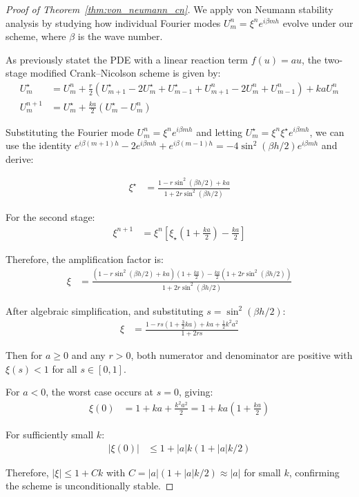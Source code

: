  \begin{proof}[Proof of Theorem~\ref{thm:von_neumann_cn}]
    We apply von Neumann stability analysis by studying how individual Fourier modes $U_m^n = \xi^n e^{i\beta mh}$ 
    evolve under our scheme, where $\beta$ is the wave number.
  
    As previously statet the PDE with a linear reaction term $f(u) = au$, the two-stage modified Crank--Nicolson 
    scheme is given by:
    \begin{align*}
      U_m^\star & = U_m^n + \frac{r}{2}\left(U_{m+1}^\star - 2U_m^\star + U_{m-1}^\star + U_{m+1}^n - 2U_m^n + U_{m-1}^n\right) + kaU_m^n \\
      U_m^{n+1} & = U_m^\star + \frac{ka}{2}(U_m^\star - U_m^n)
    \end{align*}
  
    Substituting the Fourier mode $U_m^n = \xi^n e^{i\beta mh}$ and letting 
    $U_m^\star = \xi^n \xi^\star e^{i\beta mh}$, we can use the identity 
    $e^{i\beta (m+1)h} - 2e^{i\beta mh} + e^{i\beta (m-1)h} = -4\sin^2(\beta h/2)e^{i\beta mh}$ and derive:
  
    \begin{align*}
      \xi^\star & = \frac{1 - r\sin^2(\beta h/2) + ka}{1 + 2r\sin^2(\beta h/2)}
    \end{align*}
  
    For the second stage:
    \begin{align*}
      \xi^{n+1} & = \xi^n\left[\xi_\star\left(1 + \frac{ka}{2}\right) - \frac{ka}{2}\right]
    \end{align*}
  
    Therefore, the amplification factor is:
    \begin{align*}
      \xi & = \frac{\left(1 - r\sin^2(\beta h/2) + ka\right)\left(1 + \frac{ka}{2}\right) - \frac{ka}{2}\left(1 + 2r\sin^2(\beta h/2)\right)}{1 + 2r\sin^2(\beta h/2)}
    \end{align*}
  
    After algebraic simplification, and substituting $s = \sin^2(\beta h/2)$:
    \begin{align*}
      \xi & = \frac{1 - rs(1 + \tfrac{3}{2}ka) + ka + \tfrac{1}{2}k^2a^2}{1 + 2rs}
    \end{align*}
  
    Then for $a \geq 0$ and any $r > 0$, both numerator and denominator are positive with $\xi(s) < 1$ for all 
    $s \in [0,1]$.
  
    \medskip
  
    For $a < 0$, the worst case occurs at $s = 0$, giving:
    \begin{align*}
      \xi(0) & = 1 + ka + \frac{k^2a^2}{2} = 1 + ka\left(1 + \frac{ka}{2}\right)
    \end{align*}
  
    For sufficiently small $k$:
    \begin{align*}
      |\xi(0)| & \leq 1 + |a|k(1 + |a|k/2)
    \end{align*}
  
    Therefore, $|\xi| \leq 1 + Ck$ with $C = |a|(1 + |a|k/2) \approx |a|$ for small $k$, confirming the scheme is unconditionally stable.
\end{proof}


